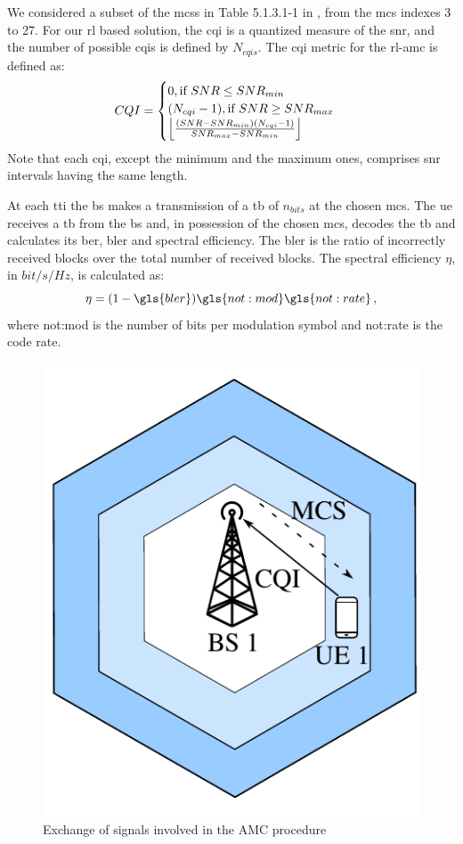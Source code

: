 We considered a subset of the \gls{mcs}s in Table 5.1.3.1-1 in \cite{3gpp.38.214}, from the \gls{mcs} indexes 3 to 27. For our \gls{rl} based solution, the \gls{cqi} is a quantized measure of the \gls{snr}, and the number of possible \gls{cqi}s is defined by $N_{cqis}$. The \gls{cqi} metric for the \gls{rl}-\gls{amc} is defined as:
\begin{equation}\label{eq:amc-cqi}
    CQI =
    \begin{cases}
    0, \text{if } SNR \leq SNR_{min}\\
    (N_{cqi}-1), \text{if } SNR \geq SNR_{max}\\
    \floor[\Big]{\frac{(SNR - SNR_{min})(N_{cqi}-1)}{SNR_{max}-SNR_{min}}}
    \end{cases}
\end{equation}
\noindent Note that each \gls{cqi}, except the minimum and the maximum ones, comprises \gls{snr} intervals having the same length.

At each \gls{tti} the \gls{bs} makes a transmission of a \gls{tb} of $n_{bits}$ at the chosen \gls{mcs}. The \gls{ue} receives a \gls{tb} from the \gls{bs} and, in possession of the chosen \gls{mcs}, decodes the \gls{tb} and calculates its \gls{ber}, \gls{bler} and spectral efficiency.
%
%
The \gls{bler} is the ratio of incorrectly received blocks over the total number of received blocks. %
%
The spectral efficiency $\eta$, in $bit/s/Hz$, is calculated as:
\begin{equation}
 \label{eq.:spec-eff}
 \eta = (1-\gls{bler})\gls{not:mod}\gls{not:rate} \, ,
\end{equation}
\noindent where \gls{not:mod} is the number of bits per modulation symbol and \gls{not:rate} is the code rate.

\begin{figure}[htb]
\centerline{\includegraphics[width=0.4\columnwidth]{figures/chp_amc/system-model-mateus.pdf}}
\caption{Exchange of signals involved in the AMC procedure}
\label{fig:amc-system-model}
\end{figure}





